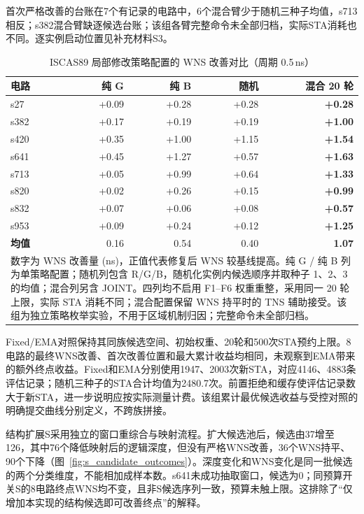 \documentclass[twocolumn,10pt,fontset=windows]{ctexart}
\begin{document}
首次严格改善的台账在7个有记录的电路中，6个混合臂少于随机三种子均值，s713相反；s382混合臂缺逐候选台账；该组各臂完整命令未全部归档，实际STA消耗也不同。逐实例启动位置见补充材料S3。

\begin{table}[H]
\centering
\caption{ISCAS89 局部修改策略配置的 WNS 改善对比（周期 0.5\,ns）}
\label{tab:ablation}
\scriptsize
\setlength{\tabcolsep}{3pt}
\begin{tabular}{lrrrr}
\toprule
\textbf{电路} & \textbf{纯 G} & \textbf{纯 B} & \textbf{随机} & \textbf{混合 20 轮} \\
\midrule
s27  & +0.09 & +0.28 & +0.28 & \textbf{+0.28} \\
s382 & +0.17 & +0.19 & +0.19 & \textbf{+1.00} \\
s420 & +0.35 & +1.00 & +1.15 & \textbf{+1.54} \\
s641 & +0.45 & +1.27 & +0.57 & \textbf{+1.63} \\
s713 & +0.05 & +0.99 & +0.64 & \textbf{+1.33} \\
s820 & +0.02 & +0.26 & +0.15 & \textbf{+0.99} \\
s832 & +0.07 & +0.06 & +0.08 & \textbf{+0.57} \\
s953 & +0.09 & +0.24 & +0.12 & \textbf{+1.25} \\
\midrule
\textbf{均值} & 0.16 & 0.54 & 0.40 & \textbf{1.07} \\
\bottomrule
\multicolumn{5}{p{0.92\columnwidth}}{\footnotesize 数字为 WNS 改善量 (ns)，正值代表修复后 WNS 较基线提高。纯 G / 纯 B 列为单策略配置；随机列包含 R/G/B，随机化实例内候选顺序并取种子 1、2、3 的均值；混合列另含 JOINT。四列均不启用 F1--F6 权重重整，采用同一 20 轮上限，实际 STA 消耗不同；混合配置保留 WNS 持平时的 TNS 辅助接受。该组为独立策略枚举实验，不用于区域机制归因；完整命令未全部归档。} \\
\end{tabular}
\end{table}
Fixed/EMA对照保持其同族候选空间、初始权重、20轮和500次STA预约上限。8电路的最终WNS改善、首次改善位置和最大累计收益均相同，未观察到EMA带来的额外终点收益。Fixed和EMA分别使用1947、2003次新STA，对应4146、4883条评估记录；随机三种子的STA合计均值为2480.7次。前置拒绝和缓存使评估记录数大于新STA，进一步说明应按实际测量计费。该组累计最优候选收益与受控对照的明确提交曲线分别定义，不跨族拼接。

结构扩展S采用独立的窗口重综合与映射流程。扩大候选池后，候选由37增至126，其中76个降低映射后的逻辑深度，但没有严格WNS改善，36个WNS持平、90个下降（图~\ref{fig:s_candidate_outcomes}）。深度变化和WNS变化是同一批候选的两个分类维度，不能相加成样本数。s641未成功抽取窗口，候选为0；同预算开关S的8电路终点WNS均不变，且非S候选序列一致，预算未触上限。这排除了“仅增加本实现的结构候选即可改善终点”的解释。
\end{document}
